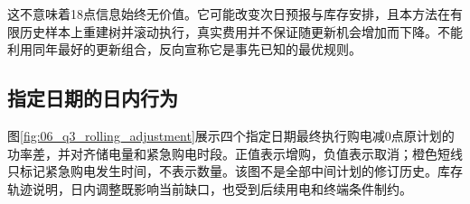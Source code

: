 这不意味着18点信息始终无价值。它可能改变次日预报与库存安排，且本方法在有限历史样本上重建树并滚动执行，真实费用并不保证随更新机会增加而下降。不能利用同年最好的更新组合，反向宣称它是事先已知的最优规则。


\subsection{指定日期的日内行为}
图\ref{fig:06_q3_rolling_adjustment}展示四个指定日期最终执行购电减0点原计划的功率差，并对齐储电量和紧急购电时段。正值表示增购，负值表示取消；橙色短线只标记紧急购电发生时间，不表示数量。该图不是全部中间计划的修订历史。库存轨迹说明，日内调整既影响当前缺口，也受到后续用电和终端条件制约。
\FloatBarrier
